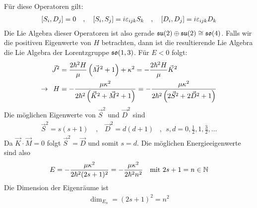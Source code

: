 Für diese Operatoren gilt:
\begin{align*}
    \left[ S_i,D_j \right] = 0
    \hspace{10pt} , \hspace{10pt}
    \left[ S_i,S_j \right] = i \varepsilon_{ijk} S_k
    \hspace{10pt} , \hspace{10pt}
    \left[ D_i,D_j \right] = i \varepsilon_{ijk} D_k
\end{align*}
Die Lie Algebra dieser Operatoren ist also gerade $\mathfrak{su}(2) \oplus \mathfrak{su}(2)
\cong \mathfrak{so}(4)$. Falls wir die positiven Eigenwerte von $H$ betrachten, dann
ist die resultierende Lie Algebra die Lie Algebra der Lorentzgruppe $\mathfrak{so}(1,3)$.
Für $E<0$ folgt:
\begin{align*}
    \vec{J}^2 &= \frac{2 \hbar^2 H}{\mu} \left( \vec{M}^2 + 1 \right) + \kappa^2
    = - \frac{2 \hbar^2 H}{\mu} \vec{K}^2
    \\
    \rightarrow \hspace{5pt}
    H &= - \frac{\mu \kappa^2}{2 \hbar^2 \left( \vec{K}^2 + \vec{M}^2 + 1 \right)}
    = - \frac{\mu \kappa^2}{2 \hbar^2 \left( 2 \vec{S}^2 + 2 \vec{D}^2 + 1 \right)}
\end{align*}
Die möglichen Eigenwerte von $\vec{S}^2$ und $\vec{D}^2$ sind
\begin{align*}
    \vec{S}^2 = s(s+1) \
    \hspace{10pt} , \hspace{10pt}
    \vec{D}^2 = d(d+1)
    \hspace{10pt} , \ \ s,d =0,\frac{1}{2},1,\frac{3}{2},\dots
\end{align*}
Da $\vec{K} \cdot \vec{M} = 0$ folgt $\vec{S}^2 = \vec{D}$ und somit $s=d$.
Die möglichen Energieeigenwerte sind also
\begin{align*}
    E = - \frac{\mu \kappa^2}{2 \hbar^2 (2s+1)^2}
    = - \frac{\mu \kappa^2}{2 \hbar^2 n^2}
    \hspace{10pt} \text{mit } 2s+1 = n \in \mathbb{N}
\end{align*}
Die Dimension der Eigenräume ist
\begin{align*}
    \dim_{E_n} = (2s+1)^2 = n^2
\end{align*}
